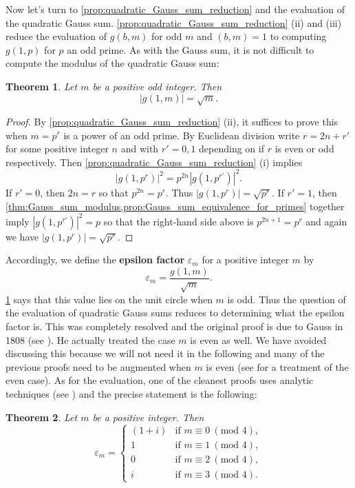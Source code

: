 \documentclass[12pt]{book}
\newtheorem{theorem}{Theorem}[section]
\theoremstyle{definition}\newframedtheorem{method}{Method}
\newcommand{\tmod}[1]{\ \left(\text{mod }#1\right)}
\newcommand{\e}{\varepsilon}
\newcommand{\<}{\langle}
\renewcommand{\>}{\rangle}
\begin{document}
      Now let's turn to \cref{prop:quadratic_Gauss_sum_reduction} and the evaluation of the quadratic Gauss sum. \cref{prop:quadratic_Gauss_sum_reduction} (ii) and (iii) reduce the evaluation of $g(b,m)$ for odd $m$ and $(b,m) = 1$ to computing $g(1,p)$ for $p$ an odd prime. As with the Gauss sum, it is not difficult to compute the modulus of the quadratic Gauss sum:

      \begin{theorem}\label{thm:quadratic_Gauss_sum_modulus}
        Let $m$ be a positive odd integer. Then
        \[
          |g(1,m)| = \sqrt{m}.
        \]
      \end{theorem}
      \begin{proof}
        By \cref{prop:quadratic_Gauss_sum_reduction} (ii), it suffices to prove this when $m = p^{r}$ is a power of an odd prime. By Euclidean division write $r = 2n+r'$ for some positive integer $n$ and with $r' = 0,1$ depending on if $r$ is even or odd respectively. Then \cref{prop:quadratic_Gauss_sum_reduction} (i) implies
        \[
          |g(1,p^{r})|^{2} = p^{2n}|g(1,p^{r'})|^{2}.
        \]
        If $r' = 0$, then $2n = r$ so that $p^{2n} = p^{r}$. Thus $|g(1,p^{r})| = \sqrt{p^{r}}$. If $r' = 1$, then \cref{thm:Gauss_sum_modulus,prop:Gauss_sum_equivalence_for_primes} together imply $|g(1,p^{r'})|^{2} = p$ so that the right-hand side above is $p^{2n+1} = p^{r}$ and again we have $|g(1,p^{r})| = \sqrt{p^{r}}$.
      \end{proof}

      Accordingly, we define the \textbf{epsilon factor} $\e_{m}$ for a positive integer $m$ by
      \[
        \e_{m} = \frac{g(1,m)}{\sqrt{m}}.
      \]
      \cref{thm:quadratic_Gauss_sum_modulus} says that this value lies on the unit circle when $m$ is odd. Thus the question of the evaluation of quadratic Gauss sums reduces to determining what the epsilon factor is. This was completely resolved and the original proof is due to Gauss in 1808 (see \cite{Gauss1808}). He actually treated the case $m$ is even as well. We have avoided discussing this because we will not need it in the following and many of the previous proofs need to be augmented when $m$ is even (see \cite{lang2013algebraic} for a treatment of the even case). As for the evaluation, one of the cleanest proofs uses analytic techniques (see \cite{lang2013algebraic}) and the precise statement is the following:

      \begin{theorem}\label{thm:Gauss's_evaluation}
        Let $m$ be a positive integer. Then
        \[
          \e_{m} = \begin{cases} (1+i) & \text{if $m \equiv 0 \tmod{4}$}, \\ 1 & \text{if $m \equiv 1 \tmod{4}$}, \\ 0 & \text{if $m \equiv 2 \tmod{4}$}, \\ i & \text{if $m \equiv 3 \tmod{4}$}. \end{cases}
        \]
      \end{theorem}
\end{document}
